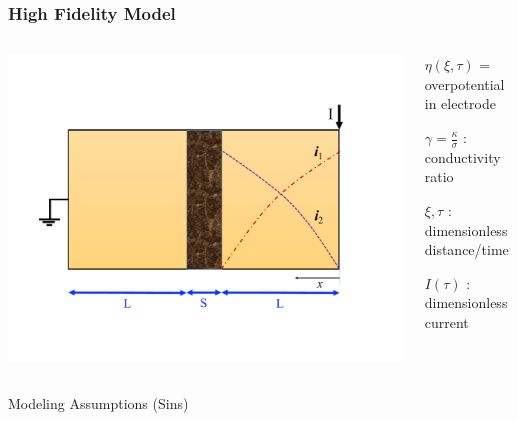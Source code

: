 \documentclass[10pt,xcolor=dvipsnames,compress]{beamer}
\begin{document}
\begin{frame}
\frametitle{High Fidelity Model}
\vfill

\begin{columns}
\begin{column}{.47\textwidth} 
	\includegraphics[trim = 0in 1.4in 0in 1.4in, clip, width=1\textwidth]{figs/schematic.pdf}
\end{column}
\begin{column}{.47\textwidth}
\begin{itemize}
\begin{small}
\item $\eta(\xi,\tau)$ = overpotential in electrode\\
\item $\gamma = \frac{\kappa}{\sigma}$ : conductivity ratio \\
\item $\xi, \tau$ : dimensionless distance/time \\
\item $I(\tau)$ : dimensionless current
\end{small}
\end{itemize}
\end{column}
\end{columns}
\begin{columns}
\begin{column}{.47\textwidth}
\vspace{-0.1in}
\begin{alertblock}{Modeling Assumptions (Sins)}
\begin{enumerate}[i.]


\end{enumerate}
\end{alertblock}
\end{column}
\end{columns}
\end{frame}
\end{document}
